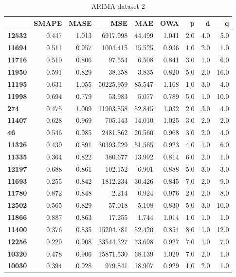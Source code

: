 \begin{table}[h]
\centering
\caption{ARIMA dataset 2}
\label{table:experiment_arima_dataset2}
\begin{tabular}{lrrrrrrrr}
\toprule
{} &  SMAPE &   MASE &        MSE &     MAE &    OWA &    p &    d &     q \\
\midrule
\textbf{12532} &  0.447 &  1.013 &   6917.998 &  44.499 &  1.041 &  2.0 &  4.0 &   5.0 \\
\textbf{11694} &  0.511 &  0.957 &   1004.415 &  15.525 &  0.936 &  1.0 &  2.0 &   1.0 \\
\textbf{11716} &  0.510 &  0.806 &     97.554 &   6.508 &  0.841 &  3.0 &  1.0 &   6.0 \\
\textbf{11950} &  0.591 &  0.829 &     38.358 &   3.835 &  0.820 &  5.0 &  2.0 &  16.0 \\
\textbf{11195} &  0.631 &  1.055 &  50225.959 &  85.547 &  1.168 &  1.0 &  3.0 &   4.0 \\
\textbf{11998} &  0.694 &  0.779 &     53.983 &   5.077 &  0.789 &  5.0 &  1.0 &  10.0 \\
\textbf{274  } &  0.475 &  1.009 &  11903.858 &  52.845 &  1.032 &  2.0 &  3.0 &   4.0 \\
\textbf{11407} &  0.628 &  0.969 &    705.143 &  14.010 &  1.025 &  3.0 &  2.0 &   2.0 \\
\textbf{46   } &  0.546 &  0.985 &   2481.862 &  20.560 &  0.968 &  3.0 &  2.0 &   4.0 \\
\textbf{11326} &  0.439 &  0.891 &  30393.229 &  51.565 &  0.923 &  4.0 &  1.0 &   6.0 \\
\textbf{11335} &  0.364 &  0.822 &    380.677 &  13.992 &  0.814 &  6.0 &  2.0 &   1.0 \\
\textbf{12197} &  0.688 &  0.861 &    102.152 &   6.901 &  0.888 &  5.0 &  3.0 &   3.0 \\
\textbf{11693} &  0.255 &  0.842 &   1812.234 &  30.426 &  0.845 &  7.0 &  2.0 &   9.0 \\
\textbf{11780} &  0.872 &  0.848 &      2.214 &   0.924 &  0.976 &  2.0 &  2.0 &   8.0 \\
\textbf{12502} &  0.565 &  0.829 &     57.018 &   5.108 &  0.830 &  5.0 &  3.0 &  10.0 \\
\textbf{11866} &  0.887 &  0.863 &     17.255 &   1.744 &  1.014 &  1.0 &  1.0 &   1.0 \\
\textbf{11400} &  0.376 &  0.835 &  15204.781 &  52.420 &  0.854 &  8.0 &  1.0 &  12.0 \\
\textbf{12256} &  0.229 &  0.908 &  33544.327 &  73.698 &  0.927 &  7.0 &  1.0 &   7.0 \\
\textbf{10320} &  0.478 &  0.906 &  15871.530 &  68.139 &  1.029 &  7.0 &  2.0 &   1.0 \\
\textbf{10030} &  0.394 &  0.928 &    979.841 &  18.907 &  0.929 &  1.0 &  2.0 &   1.0 \\
\bottomrule
\end{tabular}
\end{table}
